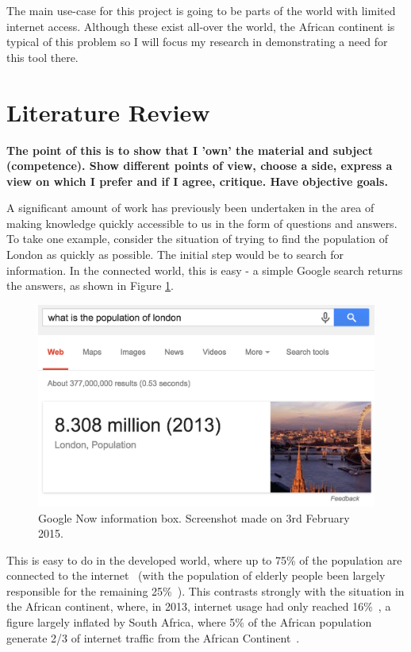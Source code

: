 \documentclass{article}
\begin{document}
The main use-case for this project is going to be parts of the world with limited internet access.  Although these exist all-over the world, the African continent is typical of this problem so I will focus my research in demonstrating a need for this tool there.

\newpage

\section{Literature Review}
\label{sec:literatureReview}

{\bf The point of this is to show that I 'own' the material and subject (competence).  Show different points of view, choose a side, express a view on which I prefer and if I agree, critique.  Have objective goals.}

A significant amount of work has previously been undertaken in the area of making knowledge quickly accessible to us in the form of questions and answers.  To take one example, consider the situation of trying to find the population of London as quickly as possible.  The initial step would be to search for information.  In the connected world, this is easy - a simple Google search returns the answers, as shown in Figure \ref{fig:googleInstant}.

\begin{figure}[htb] 
\includegraphics[width=\linewidth]{googleInstant}
\caption{Google Now information box.  Screenshot made on 3rd February 2015.}
\label{fig:googleInstant}
\end{figure}

This is easy to do in the developed world, where up to 75\% of the population are connected to the internet~\cite{ITU_Cell_Usage_2013} (with the population of elderly people been largely responsible for the remaining 25\%~\cite{Gov_Internet_Usage_UK_2014}).  This contrasts strongly with the situation in the African continent, where, in 2013, internet usage had only reached 16\%~\cite{ITU_Cell_Usage_2013}, a figure largely inflated by South Africa, where 5\% of the African population generate 2/3 of internet traffic from the African Continent~\cite{ITU_Cell_Usage_2013}.
\end{document}
